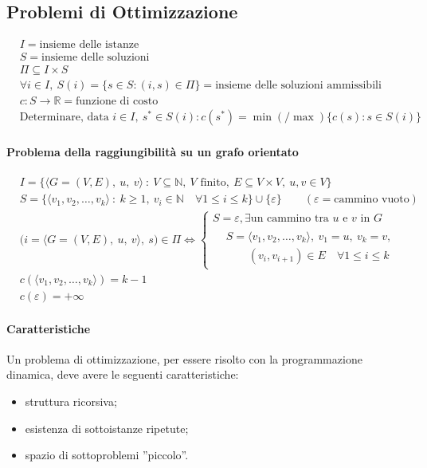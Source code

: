 \subsection{Problemi di Ottimizzazione}
\begin{align*}
	& I = \text{insieme delle istanze} \\
	& S = \text{insieme delle soluzioni} \\
	& \Pi \subseteq I \times S \\
	& \forall i \in I, \ S(i) = \{s \in S : (i,s) \in \Pi\} = \text{insieme delle soluzioni ammissibili} \\
	& c \colon S \to \mathbb{R} = \text{funzione di costo} \\
	& \text{Determinare, data } i \in I, \ s^* \in S(i) : c(s^*) = \min (\text{/}\max)\{c(s) : s \in S(i)\}
\end{align*}

\paragraph{Problema della raggiungibilità su un grafo orientato}
\begin{align*}
	& I = \{\langle G=(V,E), \ u, \ v \rangle \ : \ V \subseteq \mathbb{N}, \ V \text{ finito}, \ E \subseteq V \times V, \ u,v \in V\} \\
	& S = \{\langle v_1,v_2,\dots,v_k \rangle \ : \ k \geq 1, \ v_i \in \mathbb{N} \quad \forall 1 \leq i \leq k\} \cup \{\varepsilon\} \qquad (\varepsilon = \text{cammino vuoto}) \\
	& \Big(i = \langle G=(V,E), \ u, \ v \rangle, \ s \Big) \in \Pi \Longleftrightarrow
	\begin{cases}
	S = \varepsilon, \exists \text{un cammino tra } u \text{ e } v \text{ in } G \\
	\begin{aligned}
		& S = \langle v_1,v_2,\dots,v_k \rangle, \ v_1=u, \ v_k=v, \\
		& \qquad (v_i,v_{i+1}) \in E \quad \forall 1 \leq i \leq k
	\end{aligned}
	\end{cases} \\
	& c(\langle v_1,v_2,\dots,v_k \rangle) = k-1 \\
	& c(\varepsilon) = +\infty
\end{align*}

\paragraph{Caratteristiche}
Un problema di ottimizzazione, per essere risolto con la programmazione dinamica, deve avere le seguenti caratteristiche:
\begin{itemize}[noitemsep]
	\item struttura ricorsiva;
	\item esistenza di sottoistanze ripetute;
	\item spazio di sottoproblemi ''piccolo''.
\end{itemize}

